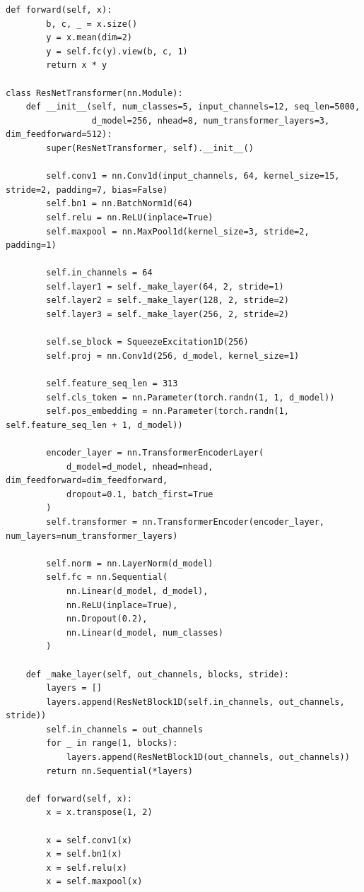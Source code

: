 \documentclass[12pt,a4paper]{report}
\begin{document}
\begin{lstlisting}[caption={Spatio-Temporal Hybrid Model (ResNet-Transformer) Architecture (src/models/hybrid.py)}]
    def forward(self, x):
        b, c, _ = x.size()
        y = x.mean(dim=2)
        y = self.fc(y).view(b, c, 1)
        return x * y

class ResNetTransformer(nn.Module):
    def __init__(self, num_classes=5, input_channels=12, seq_len=5000, 
                 d_model=256, nhead=8, num_transformer_layers=3, dim_feedforward=512):
        super(ResNetTransformer, self).__init__()
        
        self.conv1 = nn.Conv1d(input_channels, 64, kernel_size=15, stride=2, padding=7, bias=False)
        self.bn1 = nn.BatchNorm1d(64)
        self.relu = nn.ReLU(inplace=True)
        self.maxpool = nn.MaxPool1d(kernel_size=3, stride=2, padding=1)
        
        self.in_channels = 64
        self.layer1 = self._make_layer(64, 2, stride=1)
        self.layer2 = self._make_layer(128, 2, stride=2)
        self.layer3 = self._make_layer(256, 2, stride=2)
        
        self.se_block = SqueezeExcitation1D(256)
        self.proj = nn.Conv1d(256, d_model, kernel_size=1)
        
        self.feature_seq_len = 313 
        self.cls_token = nn.Parameter(torch.randn(1, 1, d_model))
        self.pos_embedding = nn.Parameter(torch.randn(1, self.feature_seq_len + 1, d_model))
        
        encoder_layer = nn.TransformerEncoderLayer(
            d_model=d_model, nhead=nhead, dim_feedforward=dim_feedforward, 
            dropout=0.1, batch_first=True
        )
        self.transformer = nn.TransformerEncoder(encoder_layer, num_layers=num_transformer_layers)
        
        self.norm = nn.LayerNorm(d_model)
        self.fc = nn.Sequential(
            nn.Linear(d_model, d_model),
            nn.ReLU(inplace=True),
            nn.Dropout(0.2),
            nn.Linear(d_model, num_classes)
        )
        
    def _make_layer(self, out_channels, blocks, stride):
        layers = []
        layers.append(ResNetBlock1D(self.in_channels, out_channels, stride))
        self.in_channels = out_channels
        for _ in range(1, blocks):
            layers.append(ResNetBlock1D(out_channels, out_channels))
        return nn.Sequential(*layers)
        
    def forward(self, x):
        x = x.transpose(1, 2)
        
        x = self.conv1(x)
        x = self.bn1(x)
        x = self.relu(x)
        x = self.maxpool(x)
        

\end{lstlisting}
\end{document}
